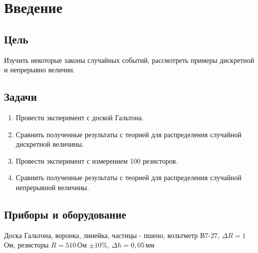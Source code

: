 \section{Введение}
\subsection{Цель}

Изучить некоторые законы случайных событий, рассмотреть примеры дискретной и непрерывно	величин. 
\subsection{Задачи}
\begin{enumerate}
	\item Провести эксперимент с доской Гальтона.
	
	\item Сравнить полученные результаты с теорией для распределения случайной дискретной величины. 
	
	\item Провести эксперимент с измерением 100 резисторов.
	
	\item  Сравнить полученные результаты с теорией для распределения случайной непрерывной величины.
	
\end{enumerate}
\subsection{Приборы и оборудование}
Доска Гальтона, воронка, линейка, частицы - пшено, вольтметр В7-27, $\Delta R = 1\,$Ом, резисторы $R = 510\,$Ом $\pm10\%$, $\Delta h = 0,05\,$мм